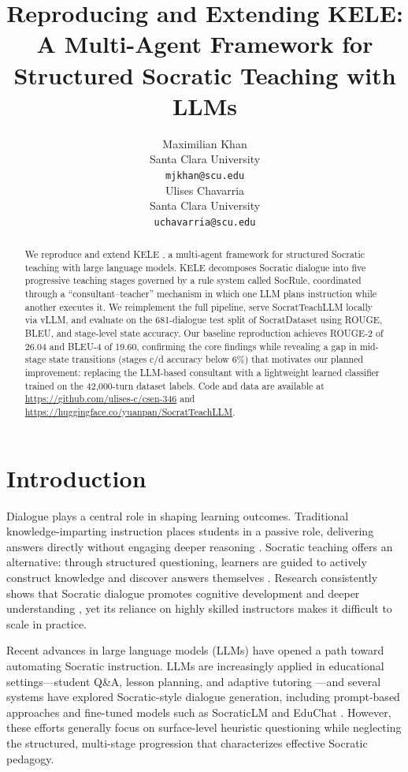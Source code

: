\documentclass[11pt]{article}
\title{Reproducing and Extending KELE: A Multi-Agent Framework for Structured Socratic Teaching with LLMs}
\author{Maximilian Khan \\
  Santa Clara University \\
  \texttt{mjkhan@scu.edu} \\\And
  Ulises Chavarria \\
  Santa Clara University \\
  \texttt{uchavarria@scu.edu} \\}
\begin{document}
\maketitle

\begin{abstract}
We reproduce and extend KELE \citep{peng2025kele}, a multi-agent framework for structured Socratic teaching with large language models. KELE decomposes Socratic dialogue into five progressive teaching stages governed by a rule system called SocRule, coordinated through a ``consultant--teacher'' mechanism in which one LLM plans instruction while another executes it. We reimplement the full pipeline, serve SocratTeachLLM locally via vLLM, and evaluate on the 681-dialogue test split of SocratDataset using ROUGE, BLEU, and stage-level state accuracy. Our baseline reproduction achieves ROUGE-2 of 26.04 and BLEU-4 of 19.60, confirming the core findings while revealing a gap in mid-stage state transitions (stages c/d accuracy below 6\%) that motivates our planned improvement: replacing the LLM-based consultant with a lightweight learned classifier trained on the 42,000-turn dataset labels. Code and data are available at \url{https://github.com/ulises-c/csen-346} and \url{https://huggingface.co/yuanpan/SocratTeachLLM}.
\end{abstract}

\section{Introduction}

Dialogue plays a central role in shaping learning outcomes. Traditional knowledge-imparting instruction places students in a passive role, delivering answers directly without engaging deeper reasoning \citep{johnston1994teaching}. Socratic teaching offers an alternative: through structured questioning, learners are guided to actively construct knowledge and discover answers themselves \citep{seeskin1987socratic, chang1998socratic}. Research consistently shows that Socratic dialogue promotes cognitive development and deeper understanding \citep{knezic2010socratic}, yet its reliance on highly skilled instructors makes it difficult to scale in practice.

Recent advances in large language models (LLMs) have opened a path toward automating Socratic instruction. LLMs are increasingly applied in educational settings---student Q\&A, lesson planning, and adaptive tutoring \citep{kasneci2023chatgpt, gan2023llmedu}---and several systems have explored Socratic-style dialogue generation, including prompt-based approaches \citep{zhang2024spl, alhossami2024socratic} and fine-tuned models such as SocraticLM \citep{liu2024socraticLM} and EduChat \citep{dan2023educhat}. However, these efforts generally focus on surface-level heuristic questioning while neglecting the structured, multi-stage progression that characterizes effective Socratic pedagogy.
\end{document}
